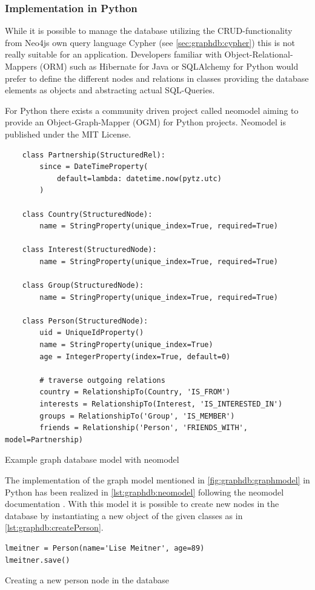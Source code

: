 \subsubsection{Implementation in Python}
While it is possible to manage the database utilizing the CRUD-functionality from Neo4js own query language Cypher (see \ref{sec:graphdb:cypher}) this is not really suitable for an application.
Developers familiar with Object-Relational-Mappers (ORM) such as Hibernate for Java or SQLAlchemy for Python would prefer to define the different nodes and relations in classes providing the database elements as objects and abstracting actual SQL-Queries.

For Python there exists a community driven project called neomodel \autocite{github:neomodel} aiming to provide an Object-Graph-Mapper (OGM) for Python projects. Neomodel is published under the MIT License.

\begin{listing}[ht]
    \begin{verbatim}
    class Partnership(StructuredRel):
        since = DateTimeProperty(
            default=lambda: datetime.now(pytz.utc)
        )

    class Country(StructuredNode):
        name = StringProperty(unique_index=True, required=True)

    class Interest(StructuredNode):
        name = StringProperty(unique_index=True, required=True)

    class Group(StructuredNode):
        name = StringProperty(unique_index=True, required=True)

    class Person(StructuredNode):
        uid = UniqueIdProperty()
        name = StringProperty(unique_index=True)
        age = IntegerProperty(index=True, default=0)

        # traverse outgoing relations
        country = RelationshipTo(Country, 'IS_FROM')
        interests = RelationshipTo(Interest, 'IS_INTERESTED_IN')
        groups = RelationshipTo('Group', 'IS_MEMBER')
        friends = Relationship('Person', 'FRIENDS_WITH', model=Partnership)
    \end{verbatim}
    \caption{Example graph database model with neomodel}
    \label{lst:graphdb:neomodel}
\end{listing}

The implementation of the graph model mentioned in \autoref{fig:graphdb:graphmodel} in Python has been realized in \autoref{lst:graphdb:neomodel} following the neomodel documentation \autocite{neomodel:rtd}. With this model it is possible to create new nodes in the database by instantiating a new object of the given classes as in \autoref{lst:graphdb:createPerson}.
\begin{listing}[H]
\begin{verbatim}
lmeitner = Person(name='Lise Meitner', age=89)
lmeitner.save()
\end{verbatim}
\caption{Creating a new person node in the database}
\label{lst:graphdb:createPerson}
\end{listing}

